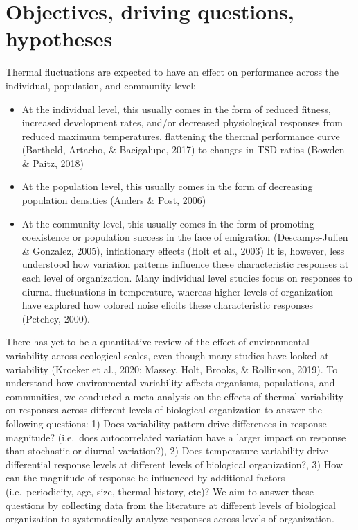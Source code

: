 \documentclass[12pt,twoside]{reedthesis}
\begin{document}
\hypertarget{objectives-driving-questions-hypotheses}{%
\section{Objectives, driving questions, hypotheses}\label{objectives-driving-questions-hypotheses}}

Thermal fluctuations are expected to have an effect on performance across the individual, population, and community level:
\begin{itemize}
\item
  At the individual level, this usually comes in the form of reduced fitness, increased development rates, and/or decreased physiological responses from reduced maximum temperatures, flattening the thermal performance curve (Bartheld, Artacho, \& Bacigalupe, 2017) to changes in TSD ratios (Bowden \& Paitz, 2018)
\item
  At the population level, this usually comes in the form of decreasing population densities (Anders \& Post, 2006)
\item
  At the community level, this usually comes in the form of promoting coexistence or population success in the face of emigration (Descamps-Julien \& Gonzalez, 2005), inflationary effects (Holt et al., 2003)
  It is, however, less understood how variation patterns influence these characteristic responses at each level of organization. Many individual level studies focus on responses to diurnal fluctuations in temperature, whereas higher levels of organization have explored how colored noise elicits these characteristic responses (Petchey, 2000).
\end{itemize}
There has yet to be a quantitative review of the effect of environmental variability across ecological scales, even though many studies have looked at variability (Kroeker et al., 2020; Massey, Holt, Brooks, \& Rollinson, 2019). To understand how environmental variability affects organisms, populations, and communities, we conducted a meta analysis on the effects of thermal variability on responses across different levels of biological organization to answer the following questions: 1) Does variability pattern drive differences in response magnitude? (i.e.~does autocorrelated variation have a larger impact on response than stochastic or diurnal variation?), 2) Does temperature variability drive differential response levels at different levels of biological organization?, 3) How can the magnitude of response be influenced by additional factors (i.e.~periodicity, age, size, thermal history, etc)? We aim to answer these questions by collecting data from the literature at different levels of biological organization to systematically analyze responses across levels of organization.
\end{document}
